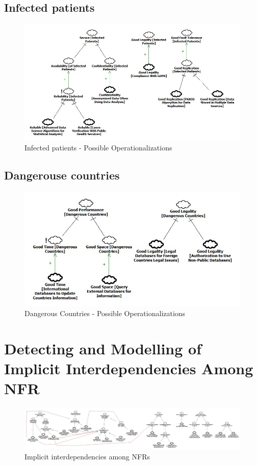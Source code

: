 \documentclass{VUMIFPSkursinis}
\begin{document}
\begin{landscape}
	\subsection{Infected patients}
		\begin{figure}[H]
			\center
			\includegraphics[scale=0.6]{StarUML/Infected-Patients-3}
			\caption{Infected patients - Possible Operationalizations} %
			\label{img:kurimoProcesas}
		\end{figure}

	\subsection{Dangerouse countries}
		\begin{figure}[H]
			\center
			\includegraphics[scale=0.6]{StarUML/Dangerous-Countries-3}
			\caption{Dangerous Countries - Possible Operationalizations} %
			\label{img:kurimoProcesas}
		\end{figure}	

\section{Detecting and Modelling of Implicit Interdependencies Among NFR}
	\begin{figure}[H]
		\center
		\includegraphics[scale=0.3]{StarUML/Implicit-InterDependencies}
		\caption{Implicit interdependencies among NFRs} %
		\label{img:kurimoProcesas}
	\end{figure}

\end{landscape}
\end{document}
